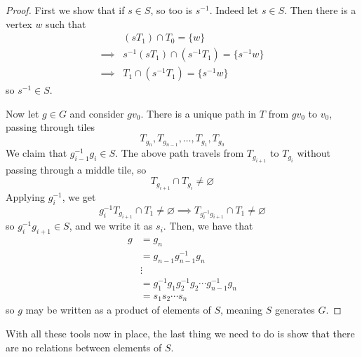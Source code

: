 \begin{proof}
    First we show that if $s \in S$, so too is $s^{-1}$. Indeed let $s \in S$. Then there is a vertex $w$ such that 
    \begin{align*}
        & (sT_1) \cap T_0 = \{w\} \\
        \implies & s^{-1}(sT_1) \cap (s^{-1}T_1) = \{s^{-1}w\} \\
        \implies & T_1 \cap (s^{-1}T_1) = \{s^{-1}w\}
    \end{align*}
    so $s^{-1} \in S$. 

    Now let $g \in G$ and consider $gv_0$. There is a unique path in $T$ from $gv_0$ to $v_0$, passing through tiles 
    \[T_{g_n}, T_{g_{n-1}}, \ldots, T_{g_1}, T_{g_0}\]
    We claim that $g_{i-1}^{-1}g_i\in S$. The above path travels from $T_{g_{i+1}}$ to $T_{g_i}$ without passing through a middle tile, so 
    \[T_{g_{i+1}} \cap T_{g_i} \neq \varnothing\]
    Applying $g_i^{-1}$, we get 
    \[g_i^{-1}T_{g_{i+1}} \cap T_1 \neq \varnothing \implies T_{g_i^{-1}g_{i+1}} \cap T_1 \neq \varnothing\]
    so $g_i^{-1}g_{i+1} \in S$, and we write it as $s_i$. Then, we have that 
    \begin{align*}
        g & = g_n \\
          & = g_{n-1}g_{n-1}^{-1}g_n \\
          & \vdots \\
          & = g_1^{-1}g_1g_2^{-1}g_2\cdots g_{n-1}^{-1}g_n \\
          & = s_1s_2 \cdots s_n
    \end{align*}
    so $g$ may be written as a product of elements of $S$, meaning $S$ generates $G$.
\end{proof}

With all these tools now in place, the last thing we need to do is show that there are no relations between elements of $S$. 

